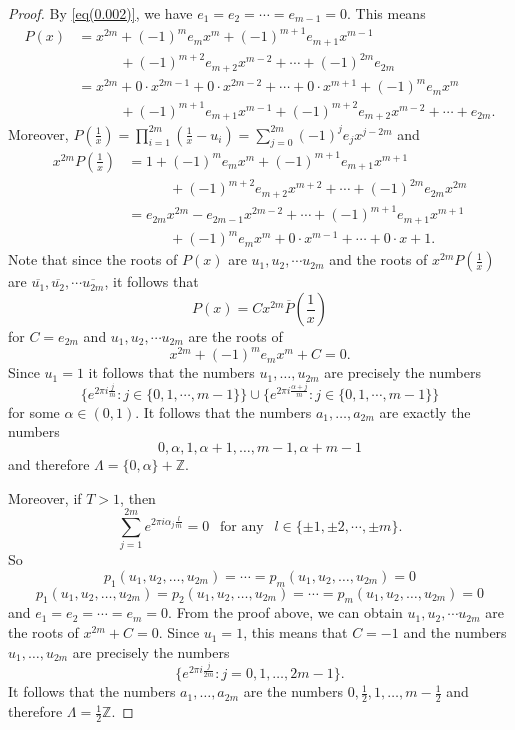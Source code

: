 \documentclass[10pt,a4paper]{amsart}
\newcommand{\ZZ}{{\mathbb Z}}
\begin{document}
\begin{proof}
By \eqref{eq(0.002)}, we have $e_1 =e_2 = \cdots =e_{m-1}=0$. This means 
\begin{align*}
P(x) &= x^{2m}+(-1)^{m}e_{m} x^{m}+(-1)^{m+1}e_{m+1} x^{m-1}\\
  &\hspace{3em} +(-1)^{m+2}e_{m+2} x^{m-2}+\cdots+(-1)^{2m}e_{2m}\\
 &= x^{2m}+0\cdot x^{2m-1}+0\cdot x^{2m-2}+\cdots +0\cdot x^{m+1} + (-1)^{m}e_{m}  x^{m} \\
 &\hspace{3em}+(-1)^{m+1}e_{m+1} x^{m-1}+(-1)^{m+2}e_{m+2} x^{m-2}+\cdots+e_{2m}.
\end{align*}
Moreover, $P\left(\frac{1}{x}\right) =\prod_{i=1}^{2m}\left(\frac{1}{x}-u_i\right)=\sum_{j=0}^{2m}(-1)^j e_j x^{j-2m}$ and 
\begin{align*} 
x^{2m}P\left(\frac{1}{x}\right)& = 1+(-1)^{m}e_{m} x^{m} +(-1)^{m+1}e_{m+1} x^{m+1}\\
 &\hspace{3em}+(-1)^{m+2}e_{m+2} x^{m+2}+\cdots+(-1)^{2m}e_{2m}x^{2m}
\\&= e_{2m}x^{2m} - e_{2m-1} x^{2m-2}+\cdots
+ (-1)^{m+1}e_{m+1}x^{m+1}  \\
&\hspace{3em} + (-1)^{m }e_{m } x^{m}  +0\cdot x^{m-1}+\cdots+ 0\cdot x  +1.
\end{align*}
Note that   since the roots of $P(x)$ are $u_1, u_2,\cdots u_{2m}$ and  the roots of $x^{2m}P(\frac{1}{x})$  are $\overline{u_1}, \overline{u_2},\cdots \overline{u_{2m}}$, it follows that  $$P(x)=Cx^{2m}\overline{P}(\frac{1}{x})$$ for $C = e_{2m}$ and  $u_1, u_2,\cdots u_{2m}$  are  the roots of $$x^{2m}+(-1)^{m}e_m x^m+C=0.$$
Since  $u_1=1$ it follows that the numbers $u_1, \ldots, u_{2m}$ are precisely the numbers  $$\{e^{2\pi i  \frac{j}{m}}: j\in\{0,1, \cdots, m-1\}\}\cup\{e^{2\pi i  \frac{\alpha+j}{m}}: j\in\{0,1, \cdots, m-1\}  \}$$ for some $\alpha\in(0, 1)$. It follows that  the numbers $a_1, \ldots, a_{2m}$ are  exactly the numbers
$$0, \alpha, 1, \alpha+1, \ldots, m-1, \alpha+m-1$$ and therefore 
$ \Lambda=\{0, \alpha\}+\mathbb{Z}$.

Moreover, if $T>1$, then 
$$
\sum_{j=1}^{2m} e^{2 \pi i \alpha_j\frac{l}{m}}=0\ \ \text{ for any }\ \ l\in\{ \pm 1,  \pm2, \cdots,  \pm  m\}.
$$
So
\ifdefined\SMART
$$p_1\left(u_1, u_2, \ldots, u_{2m}\right)=\cdots=p_m\left(u_1, u_2, \ldots, u_{2m}\right)=0$$
\else
$$p_1\left(u_1, u_2, \ldots, u_{2m}\right)=p_2\left(u_1, u_2, \ldots, u_{2m}\right)=\cdots=p_m\left(u_1, u_2, \ldots, u_{2m}\right)=0$$
\fi
and $e_1=e_2=\cdots=e_m=0$. From the proof above, we can obtain $ u_1, u_2,\cdots u_{2m}$  are  the roots of $x^{2m}+C=0$. Since  $u_1=1$, this means that $C=-1$ and the numbers $u_1, \ldots, u_{2m}$ are precisely the numbers $$ \{e^{2\pi i\frac{j}{2m}}: j=0, 1, \ldots, 2m-1\}.$$ It follows that  the numbers $a_1, \ldots, a_{2m}$ are the numbers
$0, \frac12, 1, \ldots, m-\frac12$ and therefore $\Lambda = \frac12\ZZ$.

\end{proof}
\end{document}
